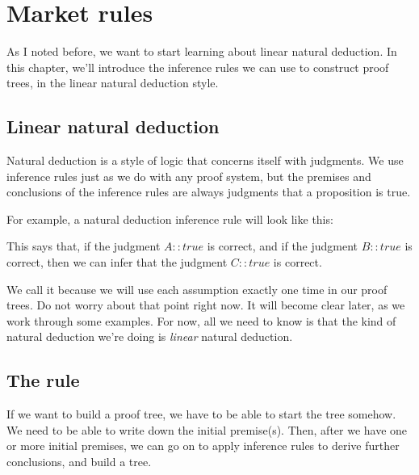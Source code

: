 \documentclass[../../../main.tex]{subfiles}
\begin{document}
\chapter{Market rules}

As I noted before, we want to start learning about linear natural deduction. In this chapter, we'll introduce the inference rules we can use to construct proof trees, in the linear natural deduction style.


\section{Linear natural deduction}

Natural deduction is a style of logic that concerns itself with judgments. We use inference rules just as we do with any proof system, but the premises and conclusions of the inference rules are always judgments that a proposition is true.

For example, a natural deduction inference rule will look like this:

\begin{prooftree*}
\end{prooftree*}

\noindent
This says that, if the judgment $A :: true$ is correct, and if the judgment $B :: true$ is correct, then we can infer that the judgment $C :: true$ is correct.

We call it  because we will use each assumption exactly one time in our proof trees. Do not worry about that point right now. It will become clear later, as we work through some examples. For now, all we need to know is that the kind of natural deduction we're doing is \emph{linear} natural deduction.


\section{The  rule}

If we want to build a proof tree, we have to be able to start the tree somehow. We need to be able to write down the initial premise(s). Then, after we have one or more initial premises, we can go on to apply inference rules to derive further conclusions, and build a tree.
\end{document}
